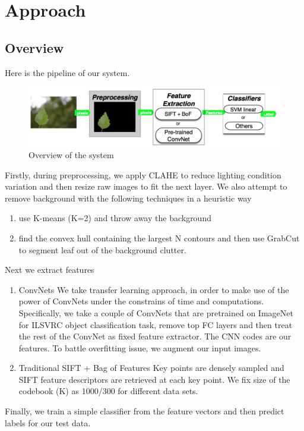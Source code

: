 \documentclass[journal, 10pt]{IEEEtran}
\begin{document}
\section{Approach}

\subsection{Overview}
Here is the pipeline of our system.
\begin{figure}[H]
  \center
  \includegraphics[width=1.0\linewidth]{overview}
  \caption{ Overview of the system }
  \label{fig:pipeline}
\end{figure}

Firstly, during preprocessing, we apply CLAHE\cite{CLAHE} to reduce lighting condition variation and then resize raw images to fit the next layer. We also attempt to remove background with the following techniques in a heuristic way
  \begin{enumerate}
    \item use K-means (K=2) and throw away the background
    \item find the convex hull containing the largest N contours and then use GrabCut\cite{Grabcut} to segment leaf out of the background clutter.
  \end{enumerate}
  Next we extract features
\begin{enumerate}
  \item ConvNets
    We take transfer learning approach, in order to make use of the power of ConvNets under the constrains of time and computations. Specifically, we take a couple of ConvNets that are pretrained on ImageNet for ILSVRC object classification task, remove top FC layers and then treat the rest of the ConvNet as fixed feature extractor. The CNN codes are our features. To battle overfitting issue, we augment our input images.
  \item Traditional SIFT + Bag of Features
    Key points are densely sampled and SIFT feature descriptors are retrieved at each key point. We fix size of the codebook (K) as 1000/300 for different data sets.
\end{enumerate}
Finally,  we train a simple classifier from the feature vectors and then predict labels for our test data.
\end{document}
